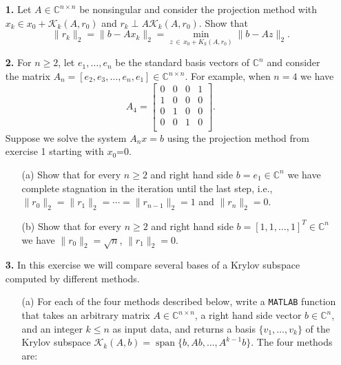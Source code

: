 \documentclass[10pt]{report}
\begin{document}
\begin{enumerate}
\item[\textbf{1.}] Let $A \in \mathbb{C}^{n \times n}$ be nonsingular and consider the projection method with $x_k \in x_0 + \mathcal{K}_k(A,r_0)$ and \linebreak $r_k \perp A \mathcal{K}_k(A,r_0)$. Show that \[\|r_{k}\|_2=\|b-Ax_k\|_2=\min_{z \,\in \, x_0+K_k(A,r_0)}\|b-Az\|_2.\]


\vspace{0.1cm} 

\item[\textbf{2.}] For $n \geq 2$, let  $e_1, \ldots, e_n$ be the standard basis vectors of $\mathbb{C}^n$ and consider the matrix 
$A_n=[e_2,e_3,\ldots ,e_n,e_1] \in \mathbb{C}^{n \times n}$. For example, when $n=4$ we have
\[  A_4 = \left[\begin{array}{cccc}
0 & 0 & 0 & 1 \\ 
1 & 0 & 0 & 0 \\
0 & 1 & 0 & 0 \\
0 & 0 & 1 & 0 \\
\end{array} \right].\]
Suppose we solve the system $A_nx=b$ using the projection method from exercise 1 starting with $x_0$=0.
\begin{itemize}
\item[(a)] Show that for every $n \geq 2$ and right hand side $b=e_1 \in \mathbb{C}^n$ we have complete stagnation in the iteration until the last step, i.e., $\|r_0\|_2 = \|r_1\|_2=\cdots =\|r_{n-1}\|_2=1$ and $\|r_n\|_2=0$.
\item[(b)] Show that for every $n \geq 2$ and right hand side $b=[1, 1, \ldots, 1]^T \in \mathbb{C}^n$ we have $\|r_0\|_2=\sqrt{n}$, $\|r_1\|_2=0.$
\end{itemize}  

\item[\textbf{3.}] In this exercise we will compare several bases of a Krylov subspace computed by different methods.  

\begin{itemize}
\item[(a)]  For each of the four methods described below, write a \verb+MATLAB+ function that takes an arbitrary matrix $A \in \mathbb{C}^{n \times n}$, a right hand side vector $b\in \mathbb{C}^n$,  and an integer $k \leq n$ as input data, and returns a basis $\{v_1, \ldots, v_k\}$ of the Krylov subspace $\mathcal{K}_k(A,b)= \operatorname{span}\{b, Ab, \ldots, A^{k-1}b\}.$ The four methods are:


\end{itemize}
\end{enumerate}
\end{document}
